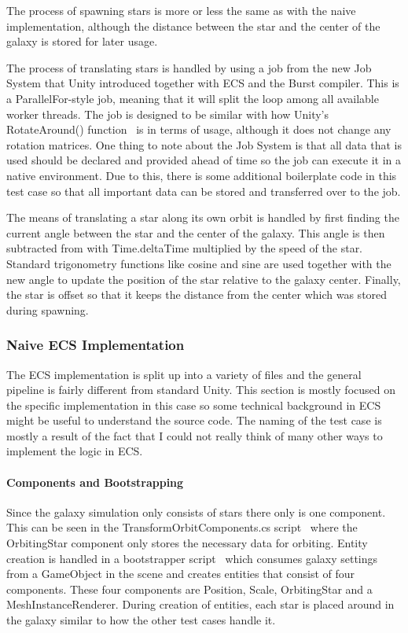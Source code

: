 The process of spawning stars is more or less the same as with the naive implementation, although the distance between the star and the center of the galaxy is stored for later usage. 

The process of translating stars is handled by using a job from the new Job System that Unity introduced together with ECS and the Burst compiler. This is a ParallelFor-style job, meaning that it will split the loop among all available worker threads. The job is designed to be similar with how Unity's RotateAround() function~\cite{rotateAroundFunction} is in terms of usage, although it does not change any rotation matrices. One thing to note about the Job System is that all data that is used should be declared and provided ahead of time so the job can execute it in a native environment. Due to this, there is some additional boilerplate code in this test case so that all important data can be stored and transferred over to the job. 

The means of translating a star along its own orbit is handled by first finding the current angle between the star and the center of the galaxy. This angle is then subtracted from with Time.deltaTime multiplied by the speed of the star. Standard trigonometry functions like cosine and sine are used together with the new angle to update the position of the star relative to the galaxy center. Finally, the star is offset so that it keeps the distance from the center which was stored during spawning. 

\subsubsection{Naive ECS Implementation}
The ECS implementation is split up into a variety of files and the general pipeline is fairly different from standard Unity. This section is mostly focused on the specific implementation in this case so some technical background in ECS might be useful to understand the source code. The naming of the test case is mostly a result of the fact that I could not really think of many other ways to implement the logic in ECS.

\paragraph{Components and Bootstrapping}
Since the galaxy simulation only consists of stars there only is one component. This can be seen in the TransformOrbitComponents.cs script~\cite{transformOrbitComponent} where the OrbitingStar component only stores the necessary data for orbiting. Entity creation is handled in a bootstrapper script~\cite{bootstrapper} which consumes galaxy settings from a GameObject in the scene and creates entities that consist of four components. These four components are Position, Scale, OrbitingStar and a MeshInstanceRenderer. During creation of entities, each star is placed around in the galaxy similar to how the other test cases handle it. 

